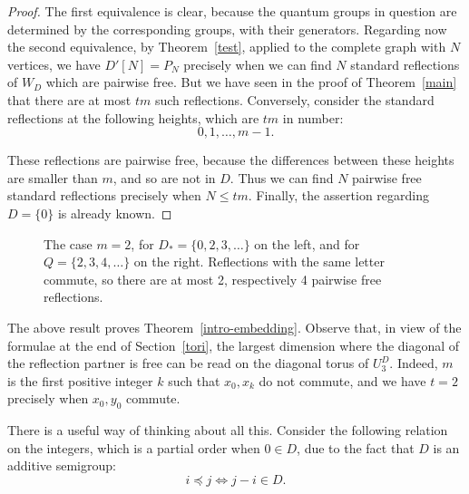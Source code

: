 \documentclass[11pt,a4paper]{article}
\begin{document}
\begin{proof}
The first equivalence is clear, because the quantum groups in question are determined by the corresponding groups, with their generators. Regarding now the second equivalence, by Theorem~\ref{test}, applied to the complete graph with $N$ vertices, we have $D'[N]=P_N$ precisely when we can find $N$ standard reflections of $W_D$ which are pairwise free. But we have seen in the proof of Theorem~\ref{main} that there are at most $tm$ such reflections. Conversely, consider the standard reflections at the following heights, which are $tm$ in number:
\[
 0,1,\ldots,m-1.
\]

These reflections are pairwise free, because the differences between these heights are smaller than $m$, and so are not in $D$. Thus we can find $N$ pairwise free standard reflections precisely when $N\leq tm$. Finally, the assertion regarding $D=\{0\}$ is already known.
\end{proof}

\begin{figure}[H]\centering
{}
\caption{The case $m=2$, for $D_*=\{0,2,3,\ldots\}$ on the left, and for $Q=\{2,3,4,\ldots\}$ on the right. Reflections with the same letter commute, so there are at most 2, respectively 4 pairwise free reflections.}
\label{path-colors}
\end{figure}

The above result proves Theorem~\ref{intro-embedding}. Observe that, in view of the formulae at the end of Section~\ref{tori}, the largest dimension where the diagonal of the reflection partner is free can be read on the diagonal torus of $U_3^D$. Indeed, $m$ is the first positive integer $k$ such that $x_0,x_k$ do not commute, and we have $t=2$ precisely when $x_0,y_0$ commute.

There is a useful way of thinking about all this. Consider the following relation on the integers, which is a partial order when $0\in D$, due to the fact that $D$ is an additive semigroup:
\[
 i\preceq j\iff j-i\in D.
\]
\end{document}
